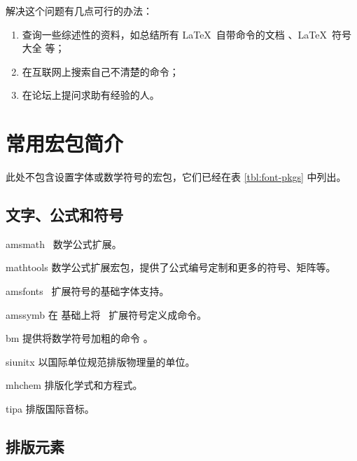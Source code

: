 解决这个问题有几点可行的办法：
\begin{enumerate}
  \item 查询一些综述性的资料，如总结所有 \LaTeX\ 自带命令的文档 \cite{latex2e}、\LaTeX\ 符号大全 \cite{symbols} 等；
  \item 在互联网上搜索自己不清楚的命令；
  \item 在论坛上提问求助有经验的人。
\end{enumerate}

\section{常用宏包简介}\label{sec:pkg-list}

\def\pkglabel#1{\makebox[60pt][l]{\pkg{#1}}}
\newenvironment{pkglist}%
  {\list{}{%
    \labelwidth=60pt 
    \itemindent=0pt 
    \leftmargin=60pt 
    \labelsep=0pt 
    \let\makelabel\pkglabel}}%
  {\endlist}

此处不包含设置字体或数学符号的宏包，它们已经在表 \ref{tbl:font-pkgs} 中列出。

\subsection{文字、公式和符号}\label{subsec:text-math-symbols}

\begin{pkglist}
  \item[amsmath]  \AmS\ 数学公式扩展。
  \item[mathtools] 数学公式扩展宏包，提供了公式编号定制和更多的符号、矩阵等。
  \item[amsfonts] \AmS\ 扩展符号的基础字体支持。
  \item[amssymb]  在  基础上将 \AmS\ 扩展符号定义成命令。
  \item[bm]       提供将数学符号加粗的命令 。
  \item[siunitx]  以国际单位规范排版物理量的单位。
  \item[mhchem]   排版化学式和方程式。
  \item[tipa]     排版国际音标。
\end{pkglist}

\subsection{排版元素}\label{subsec:pkg-elements}

